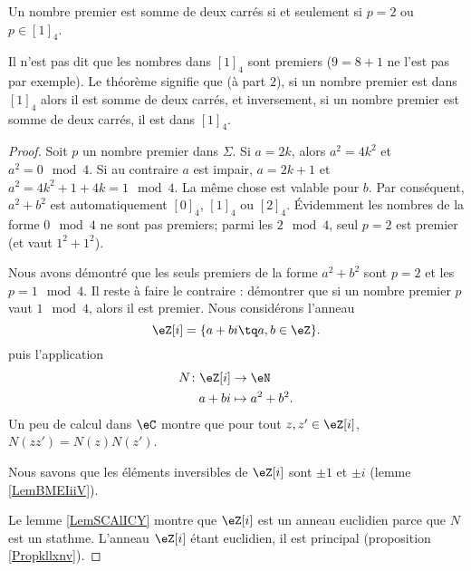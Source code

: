 \begin{theorem}   \label{ThospaAEI}
    Un nombre premier est somme de deux carrés si et seulement si \( p=2\) ou \( p\in[1]_4\).
\end{theorem}

\begin{remark}
    Il n'est pas dit que les nombres dans \( [1]_4\) sont premiers (\( 9=8+1\) ne l'est pas par exemple). Le théorème signifie que (à part \( 2\)), si un nombre premier est dans \( [1]_4\) alors il est somme de deux carrés, et inversement, si un nombre premier est somme de deux carrés, il est dans \( [1]_4\).
\end{remark}

\begin{proof}
    Soit \( p\) un nombre premier dans \( \Sigma\). Si \( a=2k\), alors \( a^2=4k^2\) et \( a^2=0\mod 4\). Si au contraire \( a\) est impair, \( a=2k+1\) et \( a^2=4k^2+1+4k=1\mod 4\). La même chose est valable pour \( b\). Par conséquent, \( a^2+b^2\) est automatiquement \( [0]_4\), \( [1]_4\) ou \( [2]_4\). Évidemment les nombres de la forme \( 0\mod 4\) ne sont pas premiers; parmi les \( 2\mod 4\), seul \( p=2\) est premier (et vaut \( 1^2+1^2\)).

    Nous avons démontré que les seuls premiers de la forme \( a^2+b^2\) sont \( p=2\) et les \( p=1\mod 4\). Il reste à faire le contraire : démontrer que si un nombre premier \( p\) vaut \( 1\mod 4\), alors il est premier. Nous considérons l'anneau
    \begin{equation}
        \eZ[i]=\{ a+bi\tq a,b\in \eZ \}.
    \end{equation}
    puis l'application
    \begin{equation}
        \begin{aligned}
            N\colon \eZ[i]&\to \eN \\
            a+bi&\mapsto a^2+b^2. 
        \end{aligned}
    \end{equation}
    Un peu de calcul dans \( \eC\) montre que pour tout \( z,z'\in \eZ[i]\), \( N(zz')=N(z)N(z')\).


    Nous savons que les éléments inversibles de \( \eZ[i]\) sont \( \pm 1\) et \( \pm i\) (lemme \ref{LemBMEIiiV}).

    Le lemme \ref{LemSCAlICY} montre que \( \eZ[i]\) est un anneau euclidien parce que \( N\) est un stathme. L'anneau \( \eZ[i]\) étant euclidien, il est principal (proposition \ref{Propkllxnv}).


\end{proof}
